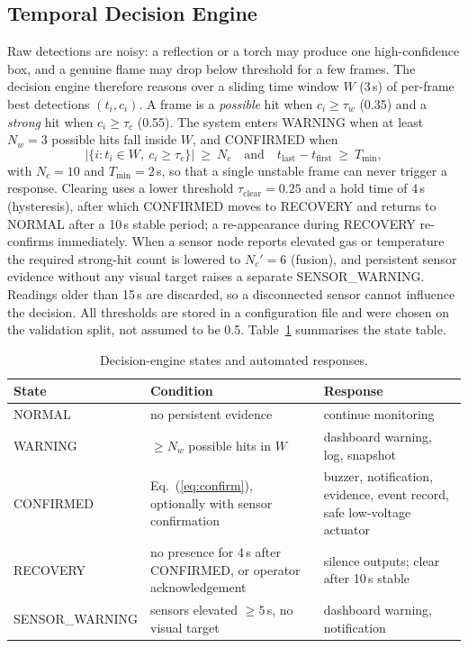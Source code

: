 \documentclass[conference]{IEEEtran}
\begin{document}
\subsection{Temporal Decision Engine}
Raw detections are noisy: a reflection or a torch may produce one high-confidence box, and a genuine flame may drop below threshold for a few frames. The decision engine therefore reasons over a sliding time window $W$ (3\,s) of per-frame best detections $(t_i, c_i)$. A frame is a \emph{possible} hit when $c_i\ge\tau_w$ (0.35) and a \emph{strong} hit when $c_i\ge\tau_c$ (0.55). The system enters WARNING when at least $N_w=3$ possible hits fall inside $W$, and CONFIRMED when
\begin{equation}
\bigl|\{i : t_i\in W,\ c_i\ge\tau_c\}\bigr|\ \ge\ N_c \quad\text{and}\quad t_{\mathrm{last}}-t_{\mathrm{first}}\ \ge\ T_{\min},
\label{eq:confirm}
\end{equation}
with $N_c=10$ and $T_{\min}=2$\,s, so that a single unstable frame can never trigger a response. Clearing uses a lower threshold $\tau_{\mathrm{clear}}=0.25$ and a hold time of 4\,s (hysteresis), after which CONFIRMED moves to RECOVERY and returns to NORMAL after a 10\,s stable period; a re-appearance during RECOVERY re-confirms immediately. When a sensor node reports elevated gas or temperature the required strong-hit count is lowered to $N_c'=6$ (fusion), and persistent sensor evidence without any visual target raises a separate SENSOR\_WARNING. Readings older than 15\,s are discarded, so a disconnected sensor cannot influence the decision. All thresholds are stored in a configuration file and were chosen on the validation split, not assumed to be 0.5. Table~\ref{tab:states} summarises the state table.

\begin{table}[t]
\caption{Decision-engine states and automated responses.}
\label{tab:states}
\centering
\footnotesize
\begin{tabular}{p{1.55cm}p{2.6cm}p{2.7cm}}
\toprule
\textbf{State} & \textbf{Condition} & \textbf{Response} \\
\midrule
NORMAL & no persistent evidence & continue monitoring \\
WARNING & $\ge N_w$ possible hits in $W$ & dashboard warning, log, snapshot \\
CONFIRMED & Eq.~(\ref{eq:confirm}), optionally with sensor confirmation & buzzer, notification, evidence, event record, safe low-voltage actuator \\
RECOVERY & no presence for 4\,s after CONFIRMED, or operator acknowledgement & silence outputs; clear after 10\,s stable \\
SENSOR\_\newline WARNING & sensors elevated $\ge5$\,s, no visual target & dashboard warning, notification \\
\bottomrule
\end{tabular}
\end{table}
\end{document}
